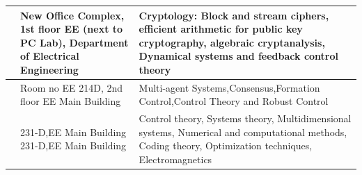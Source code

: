 \documentclass[openany]{book} %
\begin{document}
\begin{tabular}{p{3.5cm} p{3.5cm}p{9cm}}
\hline 
\href{https://www.ee.iitb.ac.in/wiki/faculty/vrs}{\color{blue}{Prof. Virendra R. Sule }} & New Office Complex, 1st floor EE (next to PC Lab), Department of Electrical Engineering & Cryptology: Block and stream ciphers, efficient arithmetic for public key cryptography, algebraic cryptanalysis, Dynamical systems and feedback control theory \\ 
\hline
\href{https://scholar.google.co.in/citations?user=9lWahYMAAAAJ&hl=en}{\color{blue}{Prof. Dwaipayan Mukherjee }}& Room no EE 214D, 2nd floor EE  Main Building & Multi-agent Systems,Consensus,Formation Control,Control Theory and Robust Control \\ 
\hline 

\href{https://www.ee.iitb.ac.in/wiki/faculty/hp}{\color{blue}{Prof. Harish K. Pillai }} & 231-D,EE Main Building 231-D,EE Main Building & Control theory, Systems theory, Multidimensional systems, Numerical
and computational methods, Coding theory, Optimization techniques, Electromagnetics \\ 
\hline
\end{tabular}
\vfill
\end{document}
